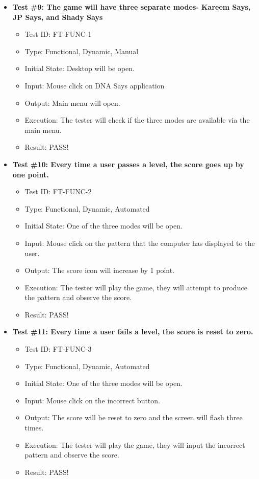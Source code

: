 \documentclass[12pt, titlepage]{article}
\begin{document}
\begin{itemize}

\item \textbf{Test \#9: The game will have three separate modes- Kareem Says, JP Says, and Shady Says }
\begin{itemize}
\item Test ID: FT-FUNC-1
\item Type: Functional, Dynamic, Manual 		
\item Initial State: Desktop will be open.					
\item Input: Mouse click on DNA Says application	
\item Output: Main menu will open.					
\item Execution: The tester will check if the three modes are available via the main menu.
\item Result: PASS!
\end{itemize}

\item \textbf{Test \#10: Every time a user passes a level, the score goes up by one point.}
\begin{itemize}
\item Test ID: FT-FUNC-2
\item Type: Functional, Dynamic, Automated		
\item Initial State: One of the three modes will be open.					
\item Input: Mouse click on the pattern that the computer has displayed to the user.					
\item Output: The score icon will increase by 1 point. 					
\item Execution: The tester will play the game, they will attempt to produce the pattern and observe the score.
\item Result: PASS!
\end{itemize}

\item \textbf{Test \#11: Every time a user fails a level, the score is reset to zero.}
\begin{itemize}
\item Test ID: FT-FUNC-3
\item Type: Functional, Dynamic, Automated	
\item Initial State: One of the three modes will be open.					
\item Input: Mouse click on the incorrect button.					
\item Output: The score will be reset to zero and the screen will flash three times. 					
\item Execution: The tester will play the game, they will input the incorrect pattern and observe the score.
\item Result: PASS!
\end{itemize}


\end{itemize}
\end{document}
